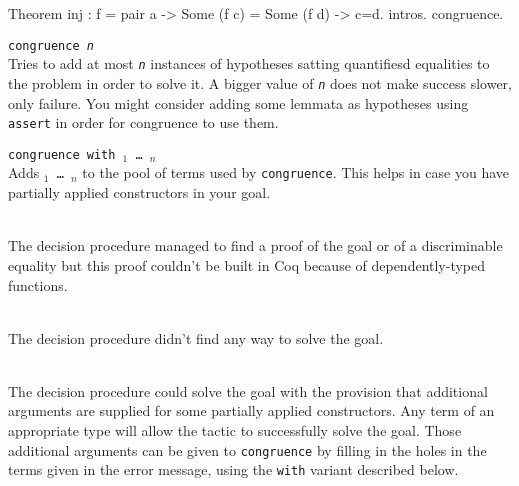 \begin{coq_example}
Theorem inj : f = pair a -> Some (f c) = Some (f d) -> c=d.
intros.
congruence.
\end{coq_example}

\begin{Variants}
 \item {\tt congruence {\sl n}}\\
  Tries to add at most {\tt \sl n} instances of hypotheses satting quantifiesd equalities to the problem in order to solve it. A bigger value of {\tt \sl n} does not make success slower, only failure. You might consider adding some lemmata as hypotheses using {\tt assert} in order for congruence to use them.

\end{Variants}

\begin{Variants}
\item {\tt congruence with \term$_1$ \dots\ \term$_n$}\\
  Adds {\tt \term$_1$ \dots\ \term$_n$} to the pool of terms used by
  {\tt congruence}. This helps in case you have partially applied
  constructors in your goal.
\end{Variants}

\begin{ErrMsgs}
  \item {} \\
    The decision procedure managed to find a proof of the goal or of
    a discriminable equality but this proof couldn't be built in Coq
    because of dependently-typed functions.
  \item {} \\
    The decision procedure didn't find any way to solve the goal.
  \item {} \\
    The decision procedure could solve the goal with the provision
    that additional arguments are supplied for some partially applied
    constructors. Any term of an appropriate type will allow the
    tactic to successfully solve the goal. Those additional arguments
    can be given to {\tt congruence} by filling in the holes in the
    terms given in the error message, using the {\tt with} variant
    described below.
\end{ErrMsgs}

